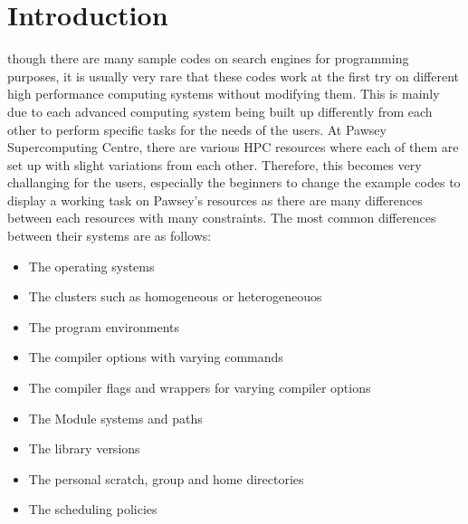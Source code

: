 \section{Introduction}

 though there are many sample codes on search engines for programming purposes, it is usually very rare that these codes work at 
the first try on different high performance computing systems without modifying them. This is mainly due to each advanced computing system being built 
up differently from each other to perform specific tasks for the needs of the users. At Pawsey Supercomputing Centre, there are various HPC resources 
where each of them are set up with slight variations from each other. Therefore, this becomes very challanging for the users, especially the beginners 
to change the example codes to display a working task on Pawsey's resources as there are many differences between each resources with many constraints. 
The most common differences between their systems are as follows:

\begin{itemize}
\item The operating systems
\item The clusters such as homogeneous or heterogeneouos
\item The program environments
\item The compiler options with varying commands
\item The compiler flags and wrappers for varying compiler options
\item The Module systems and paths 
\item The library versions
\item The personal scratch, group and home directories
\item The scheduling policies
\end{itemize}

